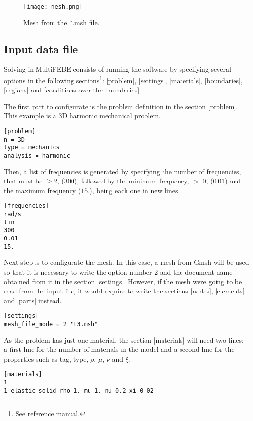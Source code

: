 \documentclass[a4]{article}
\begin{document}
\begin{figure}[h]
	\centering
	\texttt{[image: mesh.png]}
	\caption{Mesh from the *.msh file.}
	\label{fig:mesh}
\end{figure}

\subsection{Input data file}
Solving in MultiFEBE consists of running the software by specifying several options in the following sections\footnote{See reference manual.}: [problem], [settings], [materials], [boundaries], [regions] and [conditions over the boundaries].

The first part to configurate is the problem definition in the section [problem]. This example is a 3D harmonic mechanical problem.  

\begin{Verbatim}	
[problem]
n = 3D
type = mechanics
analysis = harmonic
\end{Verbatim}

Then, a list of frequencies is generated by specifying the number of frequencies, that must be $\geq 2$, (300), followed by the minimum frequency, $>$ 0, ($0.01$) and the maximum frequency ($15.$), being each one in new lines.

\begin{Verbatim}
[frequencies]
rad/s
lin
300
0.01
15.
\end{Verbatim}

Next step is to configurate the mesh. In this case, a mesh from Gmsh will be used so that it is necessary to write the option number 2 and the document name obtained from it in the section [settings]. However, if the mesh were going to be read from the input file, it would require to write the sections [nodes], [elements] and [parts] instead.

\begin{Verbatim}	
[settings]
mesh_file_mode = 2 "t3.msh"
\end{Verbatim}

As the problem has just one material, the section [materials] will need two lines: a first line for the number of materials in the model and a second line for the properties such as tag, type, $\rho$, $\mu$, $\nu$ and $\xi$.

\begin{Verbatim}	
[materials]
1
1 elastic_solid rho 1. mu 1. nu 0.2 xi 0.02
\end{Verbatim}
\end{document}
